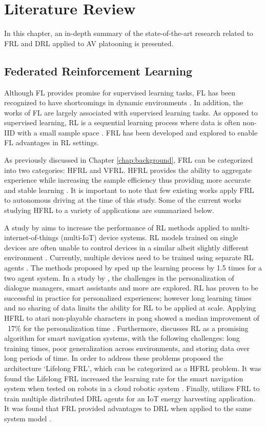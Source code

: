\chapter{Literature Review} \label{chap:litreview}
In this chapter, an in-depth summary of the state-of-the-art research related to
FRL and DRL applied to AV platooning is presented.

\section{Federated Reinforcement Learning}
Although FL provides promise for supervised learning tasks, FL has been recognized to have
shortcomings in dynamic environments \cite{Li2020a}.   In addition, the works of FL
are largely associated with supervised learning tasks. As opposed to supervised learning,
RL is a sequential learning process where data is often non-IID with a small sample space
\cite{Zhuo2019, sutton2018reinforcement}. FRL has been developed and explored to enable FL advantages
in RL settings.

As previously discussed in Chapter \ref{chap:background}, FRL can be categorized into two categories: HFRL and VFRL.
HFRL provides the ability to aggregate experience while increasing the sample efficiency thus
providing more accurate and stable learning  \cite{IntelAI19}.
It is important to note that few existing works apply
FRL to autonomous driving at the time of this study.  Some of the current works studying
HFRL to a variety of applications are summarized below.

A study by \cite{Lim2020} aims to increase the performance of RL methods applied to
multi-internet-of-things (multi-IoT) device systems.  RL models trained on single devices are often unable to control
devices in a similar albeit slightly different environment \cite{Lim2020}.  Currently,
multiple devices need to be trained using separate RL agents \cite{Lim2020}. The methods
proposed by \cite{Lim2020} sped up the learning process by 1.5 times for a two agent system.
In a study by \cite{Nadiger2019}, the challenges in the personalization of dialogue
managers, smart assistants and more are explored.  RL has proven to be successful in
practice for personalized experiences; however long learning times and no sharing of data
limits the ability for RL to be applied at scale.  Applying HFRL to atari non-playable
characters in pong showed a median improvement of ~17\% for the personalization time
\cite{Nadiger2019}. Furthermore, \cite{Liu2019b} discusses RL as a promising algorithm for
smart navigation systems, with the following challenges: long training times, poor
generalization across environments, and storing data over long periods of time.  In order
to address these problems \cite{Liu2019b} proposed the architecture `Lifelong FRL',
which can be categorized as a HFRL problem.  It was found the Lifelong FRL increased
the learning rate for the smart navigation system when tested on robots in a cloud
robotic system \cite{Liu2019b}. Finally, \cite{Ren2019} utilizes FRL to train multiple distributed
DRL agents for an IoT energy harvesting application.  It was found that FRL
provided advantages to DRL when applied to the same system model \cite{Ren2019}.


